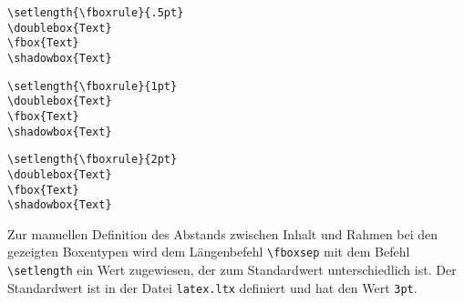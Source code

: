 \begin{minipage}[c]{0.5\textwidth}
\setlength{\parskip}{1em}
\setlength{\fboxrule}{.4pt}
\hspace{5mm}
\hspace{5mm}
\hspace{5mm}
\hfill
\end{minipage}
\hfill
\begin{minipage}[c]{0.48\textwidth}
\setlength{\parskip}{1em}
\begin{lstlisting}[label=fboxrule2, style=customlatex]
\setlength{\fboxrule}{.5pt}
\doublebox{Text} 
\fbox{Text}
\shadowbox{Text}
\end{lstlisting}
\end{minipage}

\begin{minipage}[c]{0.5\textwidth}
\setlength{\parskip}{1em}
\setlength{\fboxrule}{1pt}
\hspace{5mm}
\hspace{5mm}
\hspace{5mm}
\hfill
\end{minipage}
\hfill
\begin{minipage}[c]{0.48\textwidth}
\setlength{\parskip}{1em}
\begin{lstlisting}[label=fboxrule3, style=customlatex]
\setlength{\fboxrule}{1pt}
\doublebox{Text} 
\fbox{Text}
\shadowbox{Text}
\end{lstlisting}
\end{minipage}

\begin{minipage}[c]{0.5\textwidth}
\setlength{\parskip}{1em}
\setlength{\fboxrule}{2pt}
\hspace{5mm}
\hspace{5mm}
\hspace{5mm}
\hfill
\end{minipage}
\hfill
\begin{minipage}[c]{0.48\textwidth}
\setlength{\parskip}{2em}
\begin{lstlisting}[label=fboxrule4, style=customlatex]
\setlength{\fboxrule}{2pt}
\doublebox{Text} 
\fbox{Text}
\shadowbox{Text}
\end{lstlisting}
\end{minipage}

Zur manuellen Definition des Abstands zwischen Inhalt und Rahmen bei den gezeigten Boxentypen wird dem 
Längenbefehl \verb!\fboxsep! mit dem 
Befehl \verb!\setlength! ein Wert zugewiesen, der zum Standardwert unterschiedlich ist. 
Der Standardwert ist in der Datei \verb!latex.ltx! definiert und hat den Wert \verb!3pt!. 

